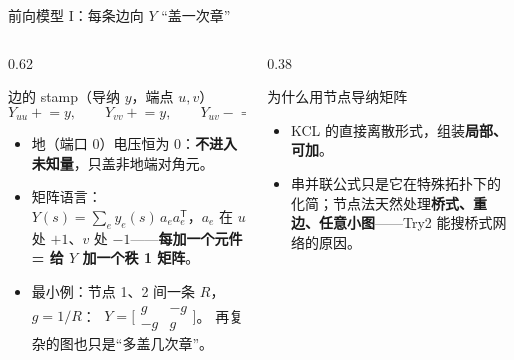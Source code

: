 \documentclass[UTF8,aspectratio=169,10pt]{ctexbeamer}
\begin{document}
\begin{frame}{前向模型 I：每条边向 $Y$ “盖一次章”}
  \begin{columns}
    \begin{column}{0.62\textwidth}
      \begin{block}{边的 stamp（导纳 $y$，端点 $u,v$）}
        {\small
        \[
          Y_{uu}\mathrel{+}=y,\qquad Y_{vv}\mathrel{+}=y,\qquad
          Y_{uv}\mathrel{-}=y,\qquad Y_{vu}\mathrel{-}=y
        \]}
      \end{block}
      \begin{itemize}
        \item 地（端口 0）电压恒为 0：\textbf{不进入未知量}，只盖非地端对角元。
        \item 矩阵语言：$Y(s)=\sum_e y_e(s)\,a_e a_e^{\mathsf T}$，$a_e$ 在 $u$ 处 $+1$、$v$ 处 $-1$——\textbf{每加一个元件 = 给 $Y$ 加一个秩 1 矩阵}。
        \item 最小例：节点 1、2 间一条 $R$，$g=1/R$：
              $\;Y=\bigl[\begin{smallmatrix} g & -g\\ -g & g\end{smallmatrix}\bigr]$。
              再复杂的图也只是“多盖几次章”。
      \end{itemize}
    \end{column}
    \begin{column}{0.38\textwidth}
      \begin{block}{为什么用节点导纳矩阵}
        \begin{itemize}
          \item KCL 的直接离散形式，组装\textbf{局部、可加}。
          \item 串并联公式只是它在特殊拓扑下的化简；节点法天然处理\textbf{桥式、重边、任意小图}——Try2 能搜桥式网络的原因。
        \end{itemize}
      \end{block}
    \end{column}
  \end{columns}
\end{frame}
\end{document}
